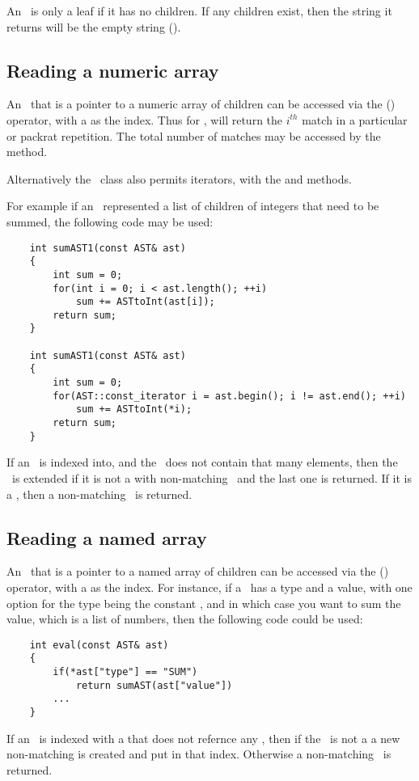 An \AST\ is only a leaf if it has no children.
    If any children exist, then the string it returns will be the empty string ().

\subsection{Reading a numeric array}
An \AST\ that is a pointer to a numeric array of children can be accessed via the (\code{[]}) operator,
    with a  as the index.
    Thus for ,  will return the $i^{th}$ match in a particular \code{*} or \code{+} packrat repetition.
    The total number of matches may be accessed by the  method.

Alternatively the \AST\ class also permits iterators, with the  and  methods.

For example if an \AST\ represented a list of children of integers that need to be summed,
    the following code may be used:
    \begin{verbatim}
    int sumAST1(const AST& ast)
    {
        int sum = 0;
        for(int i = 0; i < ast.length(); ++i)
            sum += ASTtoInt(ast[i]);
        return sum;
    }
    
    int sumAST1(const AST& ast)
    {
        int sum = 0;
        for(AST::const_iterator i = ast.begin(); i != ast.end(); ++i)
            sum += ASTtoInt(*i);
        return sum;
    }
    \end{verbatim}

If an \AST\ is indexed into, and the \AST\ does not contain that many elements,
    then the \AST\ is extended if it is not a  with non-matching \AST\,
    and the last one is returned.
    If it is a , then a non-matching \AST\ is returned.

\subsection{Reading a named array}
An \AST\ that is a pointer to a named array of children can be accessed via the (\code{[]}) operator,
    with a  as the index.
    For instance, if a \AST\ has a type and a value, with one option for the type being the constant ,
    and in which case you want to sum the value, which is a list of numbers, then the following code could be used:
    \begin{verbatim}
    int eval(const AST& ast)
    {
        if(*ast["type"] == "SUM")
            return sumAST(ast["value"])
        ...
    }
    \end{verbatim}

If an \AST\ is indexed with a  that does not refernce any \AST,
    then if the \AST\ is not a  a new non-matching \AST is created and put in that index.
    Otherwise a non-matching \AST\ is returned.
